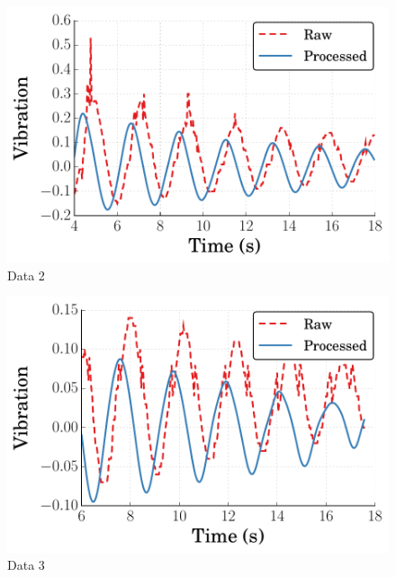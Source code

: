 \documentclass[11pt]{article}
\begin{document}
\bigskip

\begin{figure}[h!] %
   \centering
   \includegraphics[width=5in]{vibration_data2.pdf} 
   \caption{Data 2}
   \label{fig:example}
\end{figure}

\newpage

\begin{figure}[h!] %
   \centering
   \includegraphics[width=5in]{vibration_data3.pdf} 
   \caption{Data 3}
   \label{fig:example}
\end{figure}

\bigskip
\end{document}
